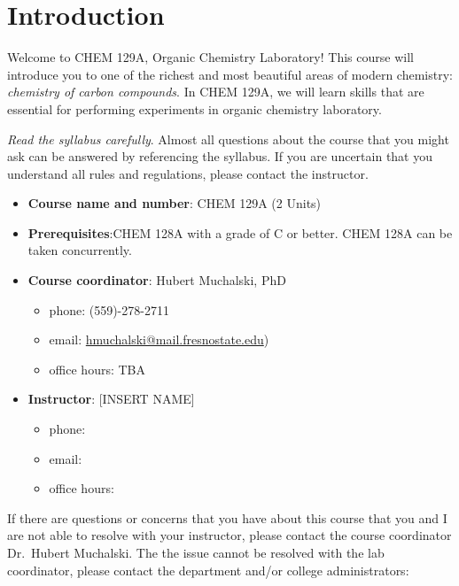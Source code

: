 \hypertarget{introduction}{%
\section{Introduction}\label{introduction}}

Welcome to CHEM 129A, Organic Chemistry Laboratory! This course will
introduce you to one of the richest and most beautiful areas of modern
chemistry: \emph{chemistry of carbon compounds}. In CHEM 129A, we will
learn skills that are essential for performing experiments in organic
chemistry laboratory.

\emph{Read the syllabus carefully}. Almost all questions about the
course that you might ask can be answered by referencing the syllabus.
If you are uncertain that you understand all rules and regulations,
please contact the instructor.

\begin{itemize}
\tightlist
\item
  \textbf{Course name and number}: CHEM 129A (2 Units)
\item
  \textbf{Prerequisites}:CHEM 128A with a grade of C or better. CHEM
  128A can be taken concurrently.
\item
  \textbf{Course coordinator}: Hubert Muchalski, PhD

  \begin{itemize}
  \tightlist
  \item
    phone: (559)-278-2711
  \item
    email: \url{hmuchalski@mail.fresnostate.edu})
  \item
    office hours: TBA
  \end{itemize}
\item
  \textbf{Instructor}: {[}INSERT NAME{]}

  \begin{itemize}
  \tightlist
  \item
    phone:
  \item
    email:
  \item
    office hours:
  \end{itemize}
\end{itemize}

If there are questions or concerns that you have about this course that
you and I are not able to resolve with your instructor, please contact
the course coordinator Dr.~Hubert Muchalski. The the issue cannot be
resolved with the lab coordinator, please contact the department and/or
college administrators:

